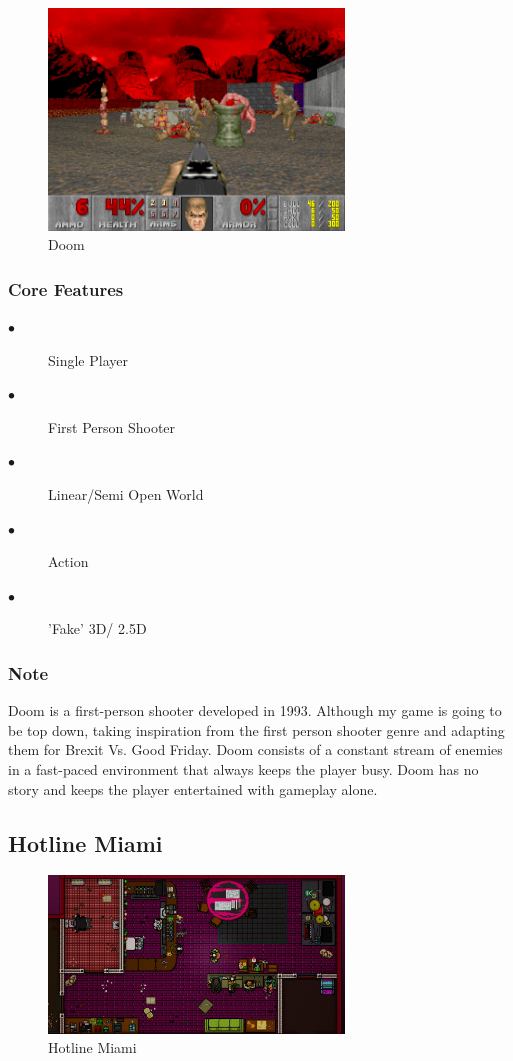 \documentclass[a4paper]{scrreprt}
\begin{document}
\begin{figure}[H]
\centering
\includegraphics[width=0.70\textwidth]{doom.png}
\caption{\label{fig:art} Doom}
\end{figure}

\subsubsection{Core Features}
\begin{description}
\item[$\bullet$] Single Player
\item[$\bullet$] First Person Shooter
\item[$\bullet$] Linear/Semi Open World
\item[$\bullet$] Action
\item[$\bullet$] 'Fake' 3D/ 2.5D
\end{description}

\subsubsection{Note}
Doom is a first-person shooter developed in 1993. 
Although my game is going to be top down, taking inspiration from the first person shooter genre and adapting them for Brexit Vs. Good Friday.
Doom consists of a constant stream of enemies in a fast-paced environment that always keeps the player busy.
Doom has no story and keeps the player entertained with gameplay alone.

\subsection{Hotline Miami}

\begin{figure}[H]
\centering
\includegraphics[width=0.70\textwidth]{hotline-miami.jpg}
\caption{\label{fig:art} Hotline Miami}
\end{figure}
\end{document}

